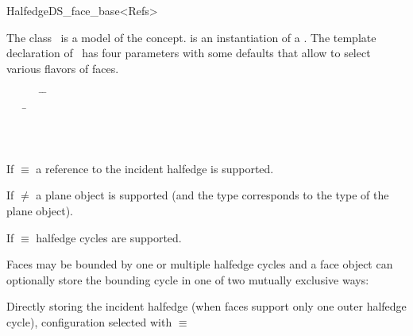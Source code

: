 
\ccRefPageBegin



\begin{ccRefClass}{HalfedgeDS_face_base<Refs>}
  
\ccDefinition
  
The class \ccRefName\ is a model of the 
concept.  is an instantiation of a .  The
template declaration of \ccRefName\ has { four} parameters with some
defaults that allow to select various flavors of faces. 

{

\begin{tabbing}
\mbox{}~~~~~~ \=  \=\\
              \> \> \mbox{}~~~ \=\\
              \> \> \>\\
              \> \> \>\\
     \> 
\end{tabbing}

If  $\equiv$  a reference to the incident halfedge is supported.

If  $\neq$  a plane object is supported (and the type  corresponds to the type of the plane object).

If  $\equiv$  halfedge cycles are supported.


Faces may be bounded by one or multiple halfedge cycles and a face object can optionally store the bounding cycle in one of two mutually exclusive ways: 

Directly storing the incident halfedge (when faces support only one outer halfedge cycle), configuration selected
with  $\equiv$ 

}
\end{ccRefClass}
